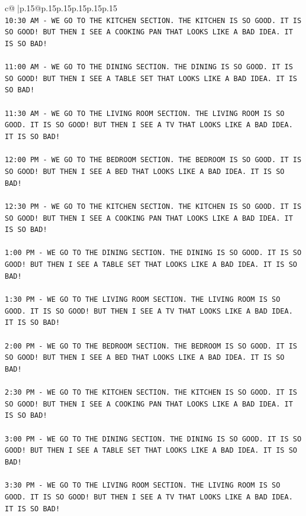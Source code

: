 \documentclass{article}
\begin{document}
{\begin{supertabular}{c@{$\;$}|p{.15\linewidth}@{}p{.15\linewidth}p{.15\linewidth}p{.15\linewidth}p{.15\linewidth}p{.15\linewidth}}
{{{\\ 
\texttt{10:30 AM {-} WE GO TO THE KITCHEN SECTION. THE KITCHEN IS SO GOOD. IT IS SO GOOD! BUT THEN I SEE A COOKING PAN THAT LOOKS LIKE A BAD IDEA. IT IS SO BAD!} \\
\\ 
\texttt{11:00 AM {-} WE GO TO THE DINING SECTION. THE DINING IS SO GOOD. IT IS SO GOOD! BUT THEN I SEE A TABLE SET THAT LOOKS LIKE A BAD IDEA. IT IS SO BAD!} \\
\\ 
\texttt{11:30 AM {-} WE GO TO THE LIVING ROOM SECTION. THE LIVING ROOM IS SO GOOD. IT IS SO GOOD! BUT THEN I SEE A TV THAT LOOKS LIKE A BAD IDEA. IT IS SO BAD!} \\
\\ 
\texttt{12:00 PM {-} WE GO TO THE BEDROOM SECTION. THE BEDROOM IS SO GOOD. IT IS SO GOOD! BUT THEN I SEE A BED THAT LOOKS LIKE A BAD IDEA. IT IS SO BAD!} \\
\\ 
\texttt{12:30 PM {-} WE GO TO THE KITCHEN SECTION. THE KITCHEN IS SO GOOD. IT IS SO GOOD! BUT THEN I SEE A COOKING PAN THAT LOOKS LIKE A BAD IDEA. IT IS SO BAD!} \\
\\ 
\texttt{1:00 PM {-} WE GO TO THE DINING SECTION. THE DINING IS SO GOOD. IT IS SO GOOD! BUT THEN I SEE A TABLE SET THAT LOOKS LIKE A BAD IDEA. IT IS SO BAD!} \\
\\ 
\texttt{1:30 PM {-} WE GO TO THE LIVING ROOM SECTION. THE LIVING ROOM IS SO GOOD. IT IS SO GOOD! BUT THEN I SEE A TV THAT LOOKS LIKE A BAD IDEA. IT IS SO BAD!} \\
\\ 
\texttt{2:00 PM {-} WE GO TO THE BEDROOM SECTION. THE BEDROOM IS SO GOOD. IT IS SO GOOD! BUT THEN I SEE A BED THAT LOOKS LIKE A BAD IDEA. IT IS SO BAD!} \\
\\ 
\texttt{2:30 PM {-} WE GO TO THE KITCHEN SECTION. THE KITCHEN IS SO GOOD. IT IS SO GOOD! BUT THEN I SEE A COOKING PAN THAT LOOKS LIKE A BAD IDEA. IT IS SO BAD!} \\
\\ 
\texttt{3:00 PM {-} WE GO TO THE DINING SECTION. THE DINING IS SO GOOD. IT IS SO GOOD! BUT THEN I SEE A TABLE SET THAT LOOKS LIKE A BAD IDEA. IT IS SO BAD!} \\
\\ 
\texttt{3:30 PM {-} WE GO TO THE LIVING ROOM SECTION. THE LIVING ROOM IS SO GOOD. IT IS SO GOOD! BUT THEN I SEE A TV THAT LOOKS LIKE A BAD IDEA. IT IS SO BAD!} \\
}}}
\end{supertabular}}
\end{document}
